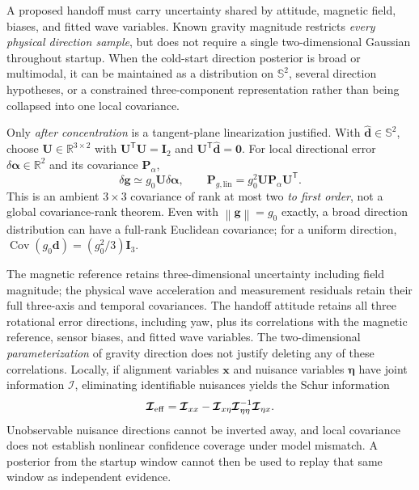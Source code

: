 \documentclass[conference]{IEEEtran}
\DeclareRobustCommand{\vct}[1]{\bm{#1}}
\DeclareRobustCommand{\mat}[1]{\bm{#1}}
\newcommand{\R}{\mathbb{R}}
\newcommand{\T}{^{\mathsf T}}
\newcommand{\norm}[1]{\left\lVert#1\right\rVert}
\begin{document}
A proposed handoff must carry uncertainty shared by attitude,
magnetic field, biases, and fitted wave variables.  Known gravity
magnitude restricts \emph{every physical direction sample}, but does
not require a single two-dimensional Gaussian throughout startup.
When the cold-start direction posterior is broad or multimodal, it
can be maintained as a distribution on $\mathbb S^2$, several
direction hypotheses, or a constrained three-component
representation rather than being collapsed into one local covariance.

Only \emph{after concentration} is a tangent-plane linearization
justified.  With $\hat{\vct d}\in\mathbb S^2$, choose
$\mat U\in\R^{3\times2}$ with
$\mat U\T\mat U=\mat I_2$ and
$\mat U\T\hat{\vct d}=\vct 0$.  For local directional error
$\delta\vct\alpha\in\R^2$ and its covariance $\mat P_\alpha$,
\begin{equation}
\delta\vct g\simeq g_0\mat U\delta\vct\alpha,\qquad
\mat P_{g,\mathrm{lin}}
 =g_0^2\mat U\mat P_\alpha\mat U\T.
\label{eq:joint-local-gravity-cov}
\end{equation}
This is an ambient $3\times3$ covariance of rank at most two
\emph{to first order}, not a global covariance-rank theorem.
Even with $\norm{\vct g}=g_0$ exactly, a broad direction
distribution can have a full-rank Euclidean covariance; for
a uniform direction,
$\operatorname{Cov}(g_0\vct d)=(g_0^2/3)\mat I_3$.

The magnetic reference retains three-dimensional uncertainty
including field magnitude; the physical wave acceleration and
measurement residuals retain their full three-axis and temporal
covariances.  The handoff attitude retains all three rotational
error directions, including yaw, plus its correlations with the
magnetic reference, sensor biases, and fitted wave variables.
The two-dimensional \emph{parameterization} of gravity direction
does not justify deleting any of these correlations.  Locally, if
alignment variables $\vct x$ and nuisance variables $\vct\eta$
have joint information $\mat{\mathcal I}$, eliminating identifiable
nuisances yields the Schur information
\begin{equation}
\mat{\mathcal I}_{\rm eff}
 =\mat{\mathcal I}_{xx}
  -\mat{\mathcal I}_{x\eta}
   \mat{\mathcal I}_{\eta\eta}^{-1}
   \mat{\mathcal I}_{\eta x}.
\label{eq:joint-schur}
\end{equation}
Unobservable nuisance directions cannot be inverted away, and
local covariance does not establish nonlinear confidence coverage
under model mismatch.  A posterior from the startup window cannot
then be used to replay that same window as independent evidence.
\end{document}
